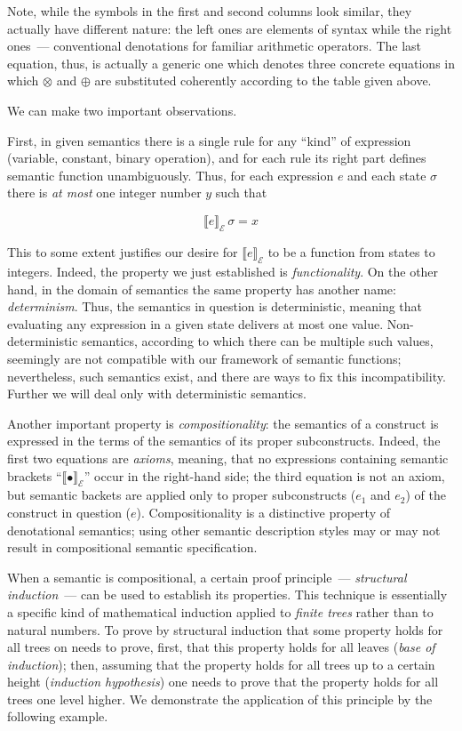 \documentclass{article}
\newcommand{\sembr}[1]{\llbracket{#1}\rrbracket}
\newcommand{\ph}{{\phantom{x}}}
\begin{document}
Note, while the symbols in the first and second columns look similar, they actually have different nature: the left ones are
elements of syntax while the right ones~--- conventional denotations for familiar arithmetic operators.
The last equation, thus, is actually a generic one which denotes three concrete equations in which $\otimes$ and $\oplus$ are
substituted coherently according to the table given above.

We can make two important observations.

First, in given semantics there is a single rule for any ``kind'' of expression (variable, constant, binary operation), and for each rule its right part defines
semantic function unambiguously. Thus, for each expression $e$ and each state $\sigma$ there is \emph{at most} one
integer number $y$ such that

\[
  \sembr{e}^\ph_\mathscr{E}\,\sigma=x
\]

This to some extent justifies our desire for $\sembr{e}^\ph_\mathscr{E}$ to be a function from states to integers. Indeed, the
property we just established is \emph{functionality}. On the other hand, in the domain of semantics the same property has
another name: \emph{determinism}. Thus, the semantics in question is deterministic, meaning that evaluating any expression in a given state
delivers at most one value. Non-deterministic semantics, according to which there can be multiple such values, seemingly are not
compatible with our framework of semantic functions; nevertheless, such semantics exist, and there are ways to fix this incompatibility.
Further we will deal only with deterministic semantics. 

Another important property is \emph{compositionality}: the semantics of a construct is expressed in the terms of the semantics
of its proper subconstructs. Indeed, the first two equations are \emph{axioms}, meaning, that no expressions containing semantic
brackets ``$\sembr{\bullet}^\ph_\mathscr{E}$'' occur in the right-hand side; the third equation is not an axiom, but semantic
backets are applied only to proper subconstructs ($e_1$ and $e_2$) of the construct in question ($e$). Compositionality is
a distinctive property of denotational semantics; using other semantic description styles may or may not result in compositional
semantic specification.

When a semantic is compositional, a certain proof principle~--- \emph{structural induction}~--- can be used to establish
its properties. This technique is essentially a specific kind of mathematical induction applied to \emph{finite trees} rather than to
natural numbers. To prove by structural induction that some property holds for all trees on needs to prove, first, that this
property holds for all leaves (\emph{base of induction}); then, assuming that the property holds for all trees up to a certain
height (\emph{induction hypothesis}) one needs to prove that the property holds for all trees one level higher. We demonstrate
the application of this principle by the following example.
\end{document}
